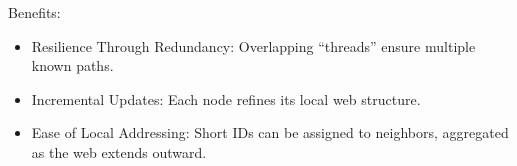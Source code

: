 \documentclass[../../../OAE-SPEC-MAIN.tex]{subfiles}
\begin{document}
Benefits:
\begin{itemize}
	\item Resilience Through Redundancy: Overlapping “threads” ensure multiple known paths.
	\item Incremental Updates: Each node refines its local web structure.
	\item Ease of Local Addressing: Short IDs can be assigned to neighbors, aggregated as the web extends outward.
\end{itemize}
\end{document}
